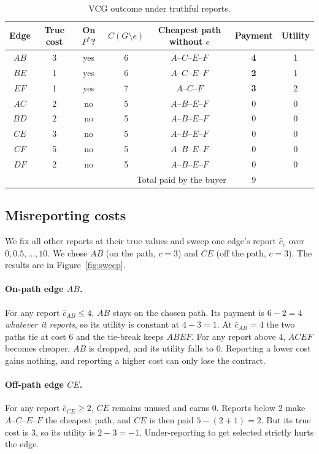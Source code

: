 \documentclass[11pt,a4paper]{article}
\begin{document}
\begin{table}[!htbp]
\centering
\caption{VCG outcome under truthful reports.}
\label{tab:vcg}
\small
\begin{tabular}{c c c c c c c}
\toprule
Edge & True cost & On $P^\ast$? & $C(G\setminus e)$ & Cheapest path without $e$ & Payment & Utility \\
\midrule
$AB$ & 3 & yes & 6 & $A$--$C$--$E$--$F$ & \textbf{4} & 1 \\
$BE$ & 1 & yes & 6 & $A$--$C$--$E$--$F$ & \textbf{2} & 1 \\
$EF$ & 1 & yes & 7 & $A$--$C$--$F$ & \textbf{3} & 2 \\
$AC$ & 2 & no & 5 & $A$--$B$--$E$--$F$ & 0 & 0 \\
$BD$ & 2 & no & 5 & $A$--$B$--$E$--$F$ & 0 & 0 \\
$CE$ & 3 & no & 5 & $A$--$B$--$E$--$F$ & 0 & 0 \\
$CF$ & 5 & no & 5 & $A$--$B$--$E$--$F$ & 0 & 0 \\
$DF$ & 2 & no & 5 & $A$--$B$--$E$--$F$ & 0 & 0 \\
\midrule
\multicolumn{5}{r}{Total paid by the buyer} & 9 & \\
\bottomrule
\end{tabular}
\end{table}

\subsection{Misreporting costs}
We fix all other reports at their true values and sweep one edge's report $\hat c_e$ over
$0,0.5,\dots,10$. We chose $AB$ (on the path, $c=3$) and $CE$ (off the path, $c=3$). The results
are in Figure~\ref{fig:sweep}.

\paragraph{On-path edge $AB$.}
For any report $\hat c_{AB}\le 4$, $AB$ stays on the chosen path. Its payment is
$6-2=4$ \emph{whatever it reports}, so its utility is constant at $4-3=1$. At $\hat c_{AB}=4$ the
two paths tie at cost 6 and the tie-break keeps $ABEF$. For any report above 4, $ACEF$ becomes
cheaper, $AB$ is dropped, and its utility falls to 0. Reporting a lower cost gains nothing, and
reporting a higher cost can only lose the contract.

\paragraph{Off-path edge $CE$.}
For any report $\hat c_{CE}\ge 2$, $CE$ remains unused and earns 0. Reports below 2 make
$A$--$C$--$E$--$F$ the cheapest path, and $CE$ is then paid $5-(2+1)=2$. But its true cost is 3,
so its utility is $2-3=-1$. Under-reporting to get selected strictly hurts the edge.
\end{document}
